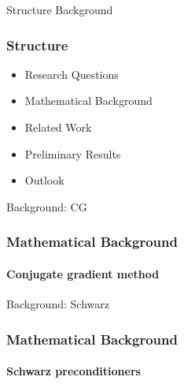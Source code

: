 \begin{frame}{Structure Background}
    \frametitle{Structure}
    \begin{itemize}
        \item Research Questions
        \item {\color{tud grapefruit}Mathematical Background}
        \item Related Work
        \item Preliminary Results
        \item Outlook
    \end{itemize}
\end{frame}

\begin{frame}[label=background]{Background: CG}
    \frametitle{Mathematical Background}
    \framesubtitle{Conjugate gradient method}
\end{frame}

\begin{frame}[label=background]{Background: Schwarz}
    \frametitle{Mathematical Background}
    \framesubtitle{Schwarz preconditioners}
\end{frame}